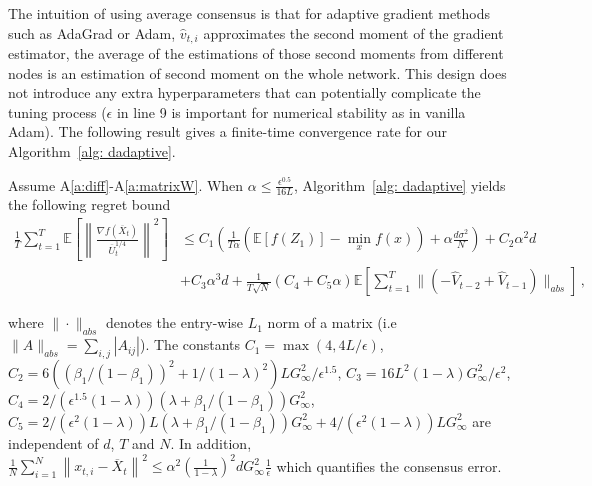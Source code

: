 \documentclass[anon,12pt]{colt2021} %
\begin{document}
The intuition of using average consensus is that for adaptive gradient methods such as AdaGrad or Adam, $\hat v_{t,i}$ approximates the second moment of the gradient estimator, the average of the estimations of those second moments from different nodes is an estimation of second moment on the whole network.  
This design does not introduce any extra hyperparameters that can potentially complicate the tuning process ($\epsilon$ in line 9 is important for numerical stability as in vanilla Adam).  
The following result gives a finite-time convergence rate for our Algorithm~\ref{alg: dadaptive}.

\begin{boxtheo}\label{thm: dagm_converge}
Assume A\ref{a:diff}-A\ref{a:matrixW}. %
	When $\alpha  \leq \frac{\epsilon^{0.5}}{16L} $, 
	  Algorithm~\ref{alg: dadaptive} yields the following regret bound
  {\small
	\begin{align}\label{eq: thm11}
	 \frac{1}{T}\sum_{t=1}^T  \mathbb E \left [\left\|\frac{\nabla f( \overline X_{t})}{\overline U_{t}^{1/4}}\right\|^2  \right]   
&	\leq   C_1\left(\frac{1}{T\alpha} ( \mathbb E  [f( Z_{1})]  -  \min_x  f(x)) +  \alpha  \frac{d\sigma^2}{N}\right) +  C_2 \alpha^2 d \\
    &+ C_3 \alpha^3d  + \frac{1}{T\sqrt{N}} (C_4 +  C_5 \alpha)  \mathbb E \left[ \sum_{t=1}^{T}   \|    (- \hat V_{t-2} + \hat V_{t-1} ) \|_{abs} \right] \, , \nonumber
	\end{align}
	}%

where $\| \cdot\|_{abs}$  denotes the entry-wise $L_1$ norm of a matrix (i.e $\| A\|_{abs} = \sum_{i,j}{|A_{ij}|}$). 
The constants $C_1 =  \max (4, 4{L/\epsilon})$,
	$C_2 =  6 (( \beta_1/(1-\beta_1))^2 + 1/(1-\lambda)^2 )L  G_{\infty}^2 /\epsilon^{1.5}$,
	$C_3 =  16L^2  (1-\lambda) G_{\infty}^2/\epsilon^2$,
	$C_4 =   2/ (\epsilon^{1.5}(1-\lambda)) (     \lambda + \beta_1/(1-\beta_1)) G_{\infty}^2$,
	$C_5 =   2/ (\epsilon^{2}(1-\lambda))   L  (\lambda + \beta_1/(1-\beta_1)) G_{\infty}^2  + 4/ (\epsilon^{2}(1-\lambda))   L    G_{\infty}^2$ are independent of $d$, $T$ and $N$. In addition, {\small$\frac{1}{N}\sum_{i=1}^N\left\| {  x_{t,i} -   \overline X_{t}}  \right\|^2   \leq \alpha^2 \left (\frac{1}{1-\lambda} \right)^2 d G_{\infty}^2 \frac{1}{\epsilon}$} which quantifies the consensus error.
\end{boxtheo}
\end{document}
